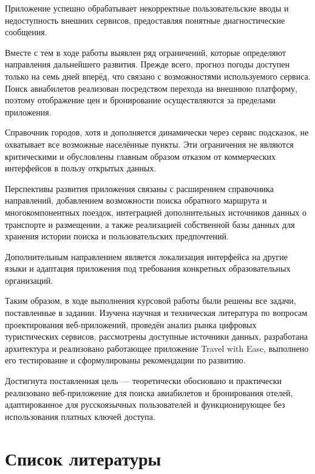 \documentclass[14pt,a4paper,oneside]{extreport}
\begin{document}
Приложение успешно обрабатывает некорректные пользовательские вводы и недоступность внешних сервисов, предоставляя понятные диагностические сообщения.

Вместе с тем в ходе работы выявлен ряд ограничений, которые определяют направления дальнейшего развития. Прежде всего, прогноз погоды доступен только на семь дней вперёд, что связано с возможностями используемого сервиса. Поиск авиабилетов реализован посредством перехода на внешнюю платформу, поэтому отображение цен и бронирование осуществляются за пределами приложения.

Справочник городов, хотя и дополняется динамически через сервис подсказок, не охватывает все возможные населённые пункты. Эти ограничения не являются критическими и обусловлены главным образом отказом от коммерческих интерфейсов в пользу открытых данных.

Перспективы развития приложения связаны с расширением справочника направлений, добавлением возможности поиска обратного маршрута и многокомпонентных поездок, интеграцией дополнительных источников данных о транспорте и размещении, а также реализацией собственной базы данных для хранения истории поиска и пользовательских предпочтений.

Дополнительным направлением является локализация интерфейса на другие языки и адаптация приложения под требования конкретных образовательных организаций.

Таким образом, в ходе выполнения курсовой работы были решены все задачи, поставленные в задании. Изучена научная и техническая литература по вопросам проектирования веб-приложений, проведён анализ рынка цифровых туристических сервисов, рассмотрены доступные источники данных, разработана архитектура и реализовано работающее приложение Travel with Ease, выполнено его тестирование и сформулированы рекомендации по развитию.

Достигнута поставленная цель — теоретически обосновано и практически реализовано веб-приложение для поиска авиабилетов и бронирования отелей, адаптированное для русскоязычных пользователей и функционирующее без использования платных ключей доступа.


\chapter*{Список литературы}
\end{document}

